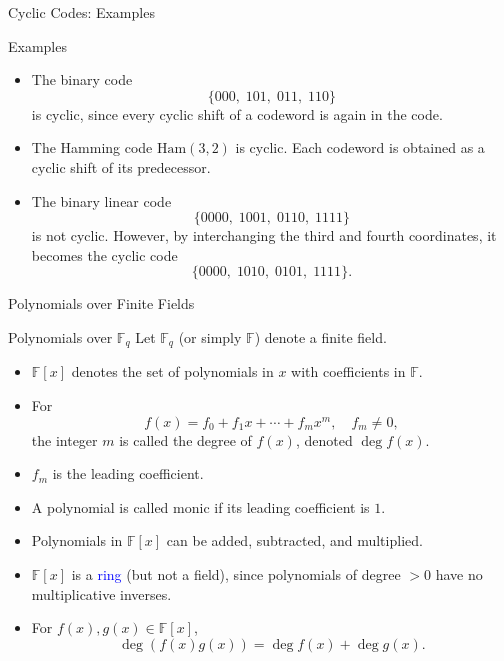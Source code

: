 \documentclass[aspectratio=169,xcolor=dvipsnames]{beamer}
\begin{document}
	\begin{frame}{Cyclic Codes: Examples}
		
		\begin{alertblock}{Examples}
			\begin{itemize}
				\item The binary code
				\[
				\{000,\;101,\;011,\;110\}
				\]
				is \alert{cyclic}, since every cyclic shift of a codeword is again in the code.
				
				\vspace{0.4em}
				
				\item  The Hamming code $\text{Ham}(3,2)$ is \alert{cyclic}.  
				Each codeword is obtained as a cyclic shift of its predecessor.
				
				\vspace{0.4em}
				
				\item The binary linear code
				\[
				\{0000,\;1001,\;0110,\;1111\}
				\]
				is \alert{not cyclic}.  
				However, by interchanging the third and fourth coordinates, it becomes the cyclic code
				\[
				\{0000,\;1010,\;0101,\;1111\}.
				\]
				
			\end{itemize}
		\end{alertblock}
		
	\end{frame}
	
	\begin{frame}{Polynomials over Finite Fields}
		
		\begin{block}{Polynomials over $\mathbb{F}_q$}
			Let $\mathbb{F}_q$ (or simply $\mathbb{F}$) denote a finite field.
			\begin{itemize}
				\item $\mathbb{F}[x]$ denotes the set of polynomials in $x$ with coefficients in $\mathbb{F}$.
				\item For
				\[
				f(x) = f_0 + f_1 x + \cdots + f_m x^m, \quad f_m \neq 0,
				\]
				the integer $m$ is called the \alert{degree} of $f(x)$, denoted $\deg f(x)$.
				\item $f_m$ is the \alert{leading coefficient}.
				\item A polynomial is called \alert{monic} if its leading coefficient is $1$.
			\end{itemize}
		\end{block}
		
		\begin{itemize}
			\item Polynomials in $\mathbb{F}[x]$ can be added, subtracted, and multiplied.
			\item $\mathbb{F}[x]$ is a \textcolor{blue}{ring} (but not a field), since polynomials of degree $>0$ have no multiplicative inverses.
			\item For $f(x), g(x) \in \mathbb{F}[x]$,
			\[
			\deg(f(x)g(x)) = \deg f(x) + \deg g(x).
			\]
		\end{itemize}
		
	\end{frame}
	
\end{document}
